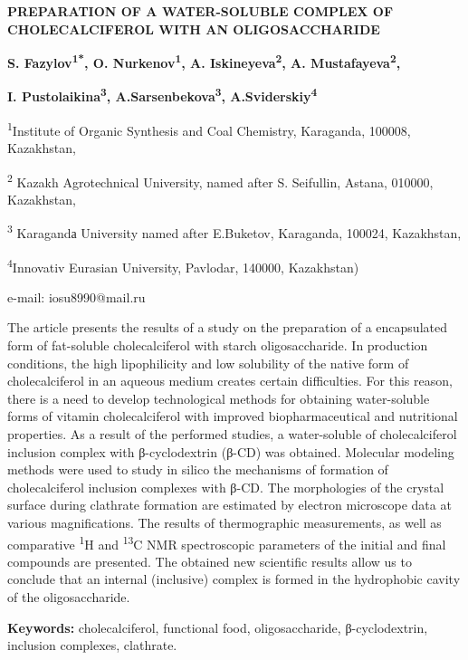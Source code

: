 \begin{center}
{\large\bfseries PREPARATION OF A WATER-SOLUBLE COMPLEX OF CHOLECALCIFEROL WITH
AN OLIGOSACCHARIDE}

\vspace{1em}
{\bfseries S. Fazylov\textsuperscript{1*}, O. Nurkenov\textsuperscript{1},
A. Iskineyeva\textsuperscript{2}, A. Mustafayeva\textsuperscript{2},}

{\bfseries I. Pustolaikina\textsuperscript{3},
A.Sarsenbekova\textsuperscript{3}, A.Sviderskiy\textsuperscript{4}}

\textsuperscript{1}Institute of Organic Synthesis and Coal Chemistry,
Karaganda, 100008, Kazakhstan,

\textsuperscript{2} Kazakh Agrotechnical University, named after S.
Seifullin, Astana, 010000, Kazakhstan,

\textsuperscript{3} Karagandа University named after E.Buketov,
Karaganda, 100024, Kazakhstan,

\textsuperscript{4}Innovativ Eurasian University, Pavlodar, 140000,
Kazakhstan)

e-mail: iosu8990@mail.ru
\end{center}

The article presents the results of a study on the preparation of a
encapsulated form of fat-soluble cholecalciferol with starch
oligosaccharide. In production conditions, the high lipophilicity and
low solubility of the native form of cholecalciferol in an aqueous
medium creates certain difficulties. For this reason, there is a need to
develop technological methods for obtaining water-soluble forms of
vitamin cholecalciferol with improved biopharmaceutical and nutritional
properties. As a result of the performed studies, a water-soluble of
cholecalciferol inclusion complex with β-cyclodextrin (β-CD) was
obtained. Molecular modeling methods were used to study in silico the
mechanisms of formation of cholecalciferol inclusion complexes with
β-CD. The morphologies of the crystal surface during clathrate formation
are estimated by electron microscope data at various magnifications. The
results of thermographic measurements, as well as comparative
\textsuperscript{1}H and \textsuperscript{13}C NMR spectroscopic
parameters of the initial and final compounds are presented. The
obtained new scientific results allow us to conclude that an internal
(inclusive) complex is formed in the hydrophobic cavity of the
oligosaccharide.

{\bfseries Keywords:} cholecalciferol, functional food, oligosaccharide,
β-cyclodextrin, inclusion complexes, clathrate.

